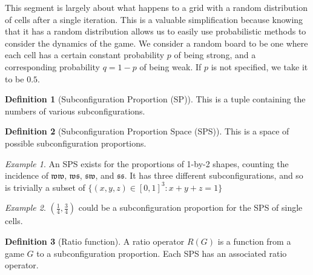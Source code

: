 \documentclass[12pt]{article}
\theoremstyle{definition}
\newtheorem{definition}{Definition}%
\theoremstyle{remark}
\theoremstyle{remark}
\newtheorem{example}{Example}%
\begin{document}

\par
This segment is largely about what happens to a grid with a random distribution of cells after a single iteration. This is a valuable simplification because knowing that it has a random distribution allows us to easily use probabilistic methods to consider the dynamics of the game. We consider a random board to be one where each cell has a certain constant probability $p$ of being strong, and a corresponding probability $q=1-p$ of being weak. If $p$ is not specified, we take it to be $0.5$.


\begin{definition}[Subconfiguration Proportion (SP)] %
This is a tuple containing the numbers of various subconfigurations.%
\end{definition}


\begin{definition}[Subconfiguration Proportion Space (SPS)]
This is a space of possible subconfiguration proportions.
\end{definition}

\begin{example}
An SPS exists for the proportions of 1-by-2 shapes, counting the incidence of $\mathfrak{w}\mathfrak{w}$, $\mathfrak{w}\mathfrak{s}$, $\mathfrak{s}\mathfrak{w}$, and $\mathfrak{s}\mathfrak{s}$. It has three different subconfigurations, and so is trivially a subset of 
$\{ \left(x,y,z\right) \in [0,1]^3 : x+y+z=1 \}$
\end{example}

%
%
%

\begin{example}
$\left( \frac{1}{4} , \frac{3}{4} \right) $ could be a subconfiguration proportion for the SPS of single cells.
 
\end{example}

\begin{definition}[Ratio function]
A ratio operator $R(G)$ is a function from a game $G$ to a subconfiguration proportion. Each SPS has an associated ratio operator.
\end{definition}
\end{document}
